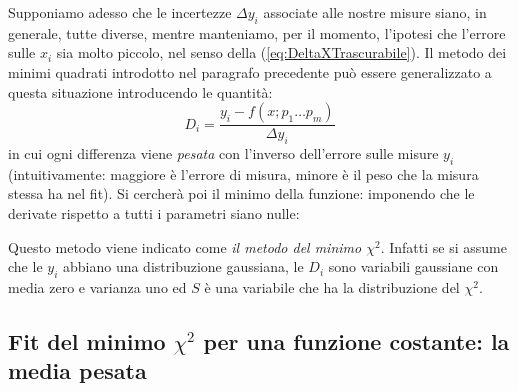 Supponiamo adesso che le incertezze
$\Delta y_i$ associate alle nostre misure siano, in generale, tutte diverse,
mentre manteniamo, per il momento, l'ipotesi che l'errore sulle $x_i$ sia
molto piccolo, nel senso della (\ref{eq:DeltaXTrascurabile}).
Il metodo dei minimi quadrati introdotto nel paragrafo precedente
pu\`o essere generalizzato a questa situazione introducendo
le quantit\`a:
$$
D_i = \frac{y_i - f(x; p_1 \ldots p_m)}{\Delta y_i}
$$
in cui ogni differenza viene {\itshape pesata} con l'inverso dell'errore
sulle misure $y_i$ (intuitivamente: maggiore \`e l'errore di misura,
minore \`e il peso che la misura stessa ha nel fit).
Si cercher\`a poi il minimo della funzione:
imponendo che le derivate rispetto a tutti i parametri siano nulle:

Questo metodo viene indicato come {\em il metodo del minimo $\chi^2$}.
Infatti se si assume che le $y_i$ abbiano una distribuzione gaussiana, le
$D_i$ sono variabili gaussiane con media zero e varianza uno ed $S$ \`e
una variabile che ha la distribuzione del $\chi^2$.


\subsection{Fit del minimo \texorpdfstring{$\chi^2$}{chi2} per una funzione
  costante: la media pesata}

